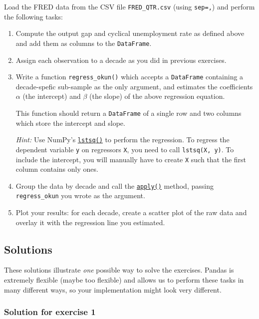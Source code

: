 \documentclass{scrartcl}
\begin{document}
Load the FRED data from the CSV file \texttt{FRED\_QTR.csv} (using
\texttt{sep=\textquotesingle{},\textquotesingle{}}) and perform the
following tasks:

\begin{enumerate}
\def\labelenumi{\arabic{enumi}.}
\item
  Compute the output gap and cyclical unemployment rate as defined above
  and add them as columns to the \texttt{DataFrame}.
\item
  Assign each observation to a decade as you did in previous exercises.
\item
  Write a function \texttt{regress\_okun()} which accepts a
  \texttt{DataFrame} containing a decade-spefic sub-sample as the only
  argument, and estimates the coefficients \(\alpha\) (the intercept)
  and \(\beta\) (the slope) of the above regression equation.

  This function should return a \texttt{DataFrame} of a single row and
  two columns which store the intercept and slope.

  \emph{Hint:} Use NumPy's
  \href{https://numpy.org/doc/stable/reference/generated/numpy.linalg.lstsq.html}{\texttt{lstsq()}}
  to perform the regression. To regress the dependent variable
  \texttt{y} on regressors \texttt{X}, you need to call
  \texttt{lstsq(X,\ y)}. To include the intercept, you will manually
  have to create \texttt{X} such that the first column contains only
  ones.
\item
  Group the data by decade and call the
  \href{https://pandas.pydata.org/pandas-docs/stable/reference/api/pandas.core.groupby.GroupBy.apply.html}{\texttt{apply()}}
  method, passing \texttt{regress\_okun} you wrote as the argument.
\item
  Plot your results: for each decade, create a scatter plot of the raw
  data and overlay it with the regression line you estimated.
\end{enumerate}


\hypertarget{solutions}{%
\subsection{Solutions}\label{solutions}}

These solutions illustrate \emph{one} possible way to solve the
exercises. Pandas is extremely flexible (maybe too flexible) and allows
us to perform these tasks in many different ways, so your implementation
might look very different.

    \hypertarget{solution-for-exercise-1}{%
\subsubsection{Solution for exercise 1}\label{solution-for-exercise-1}}
\end{document}
